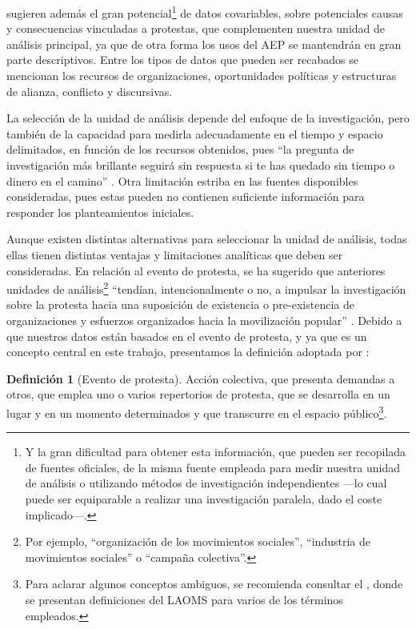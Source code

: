 \documentclass[letterpaper, 11pt]{book}
\theoremstyle{definition}
\newtheorem{definition}{Definición}[chapter]
\theoremstyle{remark}
\begin{document}
\citet{2002_Koopmans_AEP} sugieren además el gran potencial\footnote{Y la gran dificultad para obtener esta información, que pueden ser recopilada de fuentes oficiales, de la misma fuente empleada para medir nuestra unidad de análisis o utilizando métodos de investigación independientes ---lo cual puede ser equiparable a realizar una investigación paralela, dado el coste implicado---.} de datos covariables, sobre potenciales causas y consecuencias vinculadas a protestas, que complementen nuestra unidad de análisis principal, ya que de otra forma los usos del AEP se mantendrán en gran parte descriptivos. 
Entre los tipos de datos que pueden ser recabados se mencionan los recursos de organizaciones, oportunidades políticas y estructuras de alianza, conflicto y discursivas.

La selección de la unidad de análisis depende del enfoque de la investigación, pero también de la capacidad para medirla adecuadamente en el tiempo y espacio delimitados, en función de los recursos obtenidos, pues ``la pregunta de investigación más brillante seguirá sin respuesta si te has quedado sin tiempo o dinero en el camino'' \citep[149]{2010_Franzosi_QNA}. 
Otra limitación estriba en las fuentes disponibles consideradas, pues estas pueden no contienen suficiente información para responder los planteamientos iniciales. 

Aunque existen distintas alternativas para seleccionar la unidad de análisis, todas ellas tienen distintas ventajas y limitaciones analíticas que deben ser consideradas. 
En relación al evento de protesta, se ha sugerido que anteriores unidades de análisis\footnote{
Por ejemplo, ``organización de los movimientos sociales'', ``industria de movimientos sociales'' o ``campaña colectiva''.} ``tendían, intencionalmente o no, a impulsar la investigación sobre la protesta hacia una suposición de existencia o pre-existencia de organizaciones y esfuerzos organizados hacia la movilización popular'' \citep[21]{2005_Strawn_Tesis}. 
Debido a que nuestros datos están basados en el evento de protesta, y ya que es un concepto central en este trabajo, presentamos la definición adoptada por \citet{2017_Cadena_ManualLAOMS}:

\begin{definition}[Evento de protesta]
\label{EP}
	Acción colectiva, que presenta demandas a otros, que emplea uno o varios repertorios de protesta, que se desarrolla en un lugar y en un momento determinados y que transcurre en el espacio público\footnote{Para aclarar algunos conceptos ambiguos, se recomienda consultar el , donde se presentan definiciones del LAOMS para varios de los términos empleados.}.
\end{definition}
\end{document}
